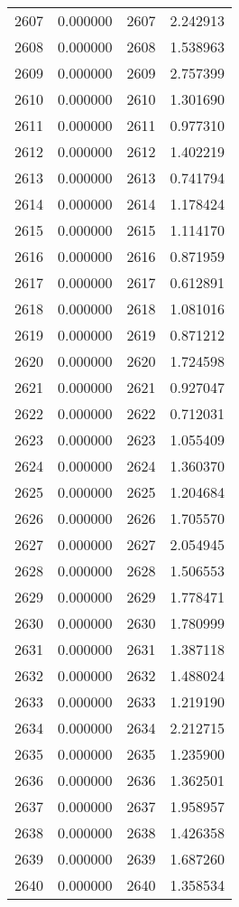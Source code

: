 \documentclass[12pt]{article}
\begin{document}
\begin{longtable}{@{}cccc@{}}
2607 & 0.000000 & 2607 & 2.242913 \\
2608 & 0.000000 & 2608 & 1.538963 \\
2609 & 0.000000 & 2609 & 2.757399 \\
2610 & 0.000000 & 2610 & 1.301690 \\
2611 & 0.000000 & 2611 & 0.977310 \\
2612 & 0.000000 & 2612 & 1.402219 \\
2613 & 0.000000 & 2613 & 0.741794 \\
2614 & 0.000000 & 2614 & 1.178424 \\
2615 & 0.000000 & 2615 & 1.114170 \\
2616 & 0.000000 & 2616 & 0.871959 \\
2617 & 0.000000 & 2617 & 0.612891 \\
2618 & 0.000000 & 2618 & 1.081016 \\
2619 & 0.000000 & 2619 & 0.871212 \\
2620 & 0.000000 & 2620 & 1.724598 \\
2621 & 0.000000 & 2621 & 0.927047 \\
2622 & 0.000000 & 2622 & 0.712031 \\
2623 & 0.000000 & 2623 & 1.055409 \\
2624 & 0.000000 & 2624 & 1.360370 \\
2625 & 0.000000 & 2625 & 1.204684 \\
2626 & 0.000000 & 2626 & 1.705570 \\
2627 & 0.000000 & 2627 & 2.054945 \\
2628 & 0.000000 & 2628 & 1.506553 \\
2629 & 0.000000 & 2629 & 1.778471 \\
2630 & 0.000000 & 2630 & 1.780999 \\
2631 & 0.000000 & 2631 & 1.387118 \\
2632 & 0.000000 & 2632 & 1.488024 \\
2633 & 0.000000 & 2633 & 1.219190 \\
2634 & 0.000000 & 2634 & 2.212715 \\
2635 & 0.000000 & 2635 & 1.235900 \\
2636 & 0.000000 & 2636 & 1.362501 \\
2637 & 0.000000 & 2637 & 1.958957 \\
2638 & 0.000000 & 2638 & 1.426358 \\
2639 & 0.000000 & 2639 & 1.687260 \\
2640 & 0.000000 & 2640 & 1.358534 \\

\end{longtable}
\end{document}
